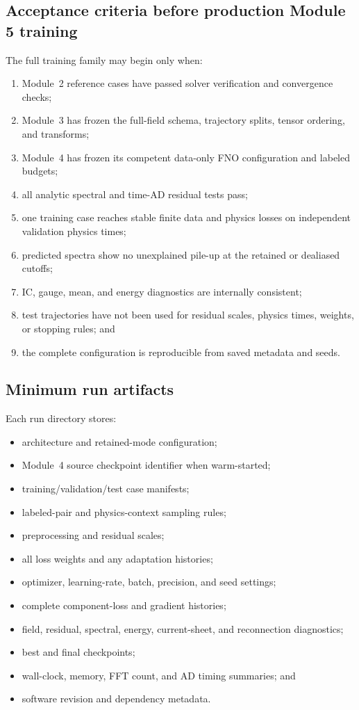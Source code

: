 \documentclass[11pt]{article}
\begin{document}
\subsection{Acceptance criteria before production Module 5 training}
The full training family may begin only when:
\begin{enumerate}[label=\arabic*.]
  \item Module~2 reference cases have passed solver verification and convergence checks;
  \item Module~3 has frozen the full-field schema, trajectory splits, tensor ordering, and transforms;
  \item Module~4 has frozen its competent data-only FNO configuration and labeled budgets;
  \item all analytic spectral and time-AD residual tests pass;
  \item one training case reaches stable finite data and physics losses on independent validation physics times;
  \item predicted spectra show no unexplained pile-up at the retained or dealiased cutoffs;
  \item IC, gauge, mean, and energy diagnostics are internally consistent;
  \item test trajectories have not been used for residual scales, physics times, weights, or stopping rules; and
  \item the complete configuration is reproducible from saved metadata and seeds.
\end{enumerate}

\subsection{Minimum run artifacts}
Each run directory stores:
\begin{itemize}
  \item architecture and retained-mode configuration;
  \item Module~4 source checkpoint identifier when warm-started;
  \item training/validation/test case manifests;
  \item labeled-pair and physics-context sampling rules;
  \item preprocessing and residual scales;
  \item all loss weights and any adaptation histories;
  \item optimizer, learning-rate, batch, precision, and seed settings;
  \item complete component-loss and gradient histories;
  \item field, residual, spectral, energy, current-sheet, and reconnection diagnostics;
  \item best and final checkpoints;
  \item wall-clock, memory, FFT count, and AD timing summaries; and
  \item software revision and dependency metadata.
\end{itemize}
\end{document}
